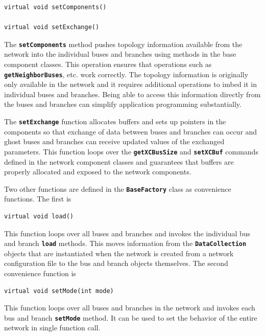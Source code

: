\documentclass[12pt]{report} %
\begin{document}
{
\color{red}
\begin{Verbatim}[fontseries=b]
virtual void setComponents()

virtual void setExchange()
\end{Verbatim}
}

The \texttt{\textbf{setComponents}} method pushes topology information available from the network into the individual buses and branches using methods in the base component classes. This operation ensures that operations such as \texttt{\textbf{getNeighborBuses}}, etc. work correctly. The topology information is originally only available in the network and it requires additional operations to imbed it in individual buses and branches. Being able to access this information directly from the buses and branches can simplify application programming substantially.

The \texttt{\textbf{setExchange}} function allocates buffers and sets up pointers in the components so that exchange of data between buses and branches can occur and ghost buses and branches can receive updated values of the exchanged parameters. This function loops over the \texttt{\textbf{getXCBusSize}} and \texttt{\textbf{setXCBuf}} commands defined in the network component classes and guarantees that buffers are properly allocated and exposed to the network components.

Two other functions are defined in the \texttt{\textbf{BaseFactory}} class as convenience functions. The first is

{
\color{red}
\begin{Verbatim}[fontseries=b]
virtual void load()
\end{Verbatim}
}

This function loops over all buses and branches and invokes the individual bus and branch \texttt{\textbf{load}} methods. This moves information from the \texttt{\textbf{DataCollection}} objects that are instantiated when the network is created from a network configuration file to the bus and branch objects themselves. The second convenience function is

{
\color{red}
\begin{Verbatim}[fontseries=b]
virtual void setMode(int mode)
\end{Verbatim}
}

This function loops over all buses and branches in the network and invokes each bus and branch \texttt{\textbf{setMode}} method. It can be used to set the behavior of the entire network in single function call.
\end{document}
